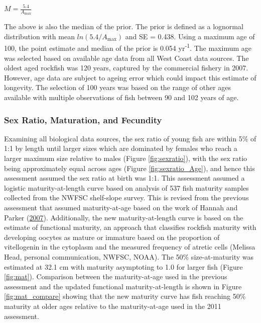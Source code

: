 \documentclass[12pt,]{article}
\begin{document}
\begin{centering}

$M=\frac{5.4}{A_{\text{max}}}$

\end{centering}

The above is also the median of the prior. The prior is defined as a
lognormal distribution with mean \(ln(5.4/A_{\text{max}})\) and SE =
0.438. Using a maximum age of 100, the point estimate and median of the
prior is 0.054 yr\textsuperscript{-1}. The maximum age was selected
based on available age data from all West Coast data sources. The oldest
aged rockfish was 120 years, captured by the commercial fishery in 2007.
However, age data are subject to ageing error which could impact this
estimate of longevity. The selection of 100 years was based on the range
of other ages available with multiple observations of fish between 90
and 102 years of age.

\subsubsection{Sex Ratio, Maturation, and
Fecundity}\label{sex-ratio-maturation-and-fecundity}

Examining all biological data sources, the sex ratio of young fish are
within 5\% of 1:1 by length until larger sizes which are dominated by
females who reach a larger maximum size relative to males (Figure
\ref{fig:sexratio}), with the sex ratio being approximately equal across
ages (Figure \ref{fig:sexratio_Age}), and hence this assessment assumed
the sex ratio at birth was 1:1. This assessment assumed a logistic
maturity-at-length curve based on analysis of 537 fish maturity samples
collected from the NWFSC shelf-slope survey. This is revised from the
previous assessment that assumed maturity-at-age based on the work of
Hannah and Parker
(\protect\hyperlink{ref-hannah_age-modulated_2007}{2007}). Additionally,
the new maturity-at-length curve is based on the estimate of functional
maturity, an approach that classifies rockfish maturity with developing
oocytes as mature or immature based on the proportion of vitellogenin in
the cytoplasm and the measured frequency of atretic cells (Melissa Head,
personal communication, NWFSC, NOAA). The 50\% size-at-maturity was
estimated at 32.1 cm with maturity asymptoting to 1.0 for larger fish
(Figure \ref{fig:mat}). Comparison between the maturity-at-age used in
the previous assessment and the updated functional maturity-at-length is
shown in Figure \ref{fig:mat_compare} showing that the new maturity
curve has fish reaching 50\% maturity at older ages relative to the
maturity-at-age used in the 2011 assessment.
\end{document}
